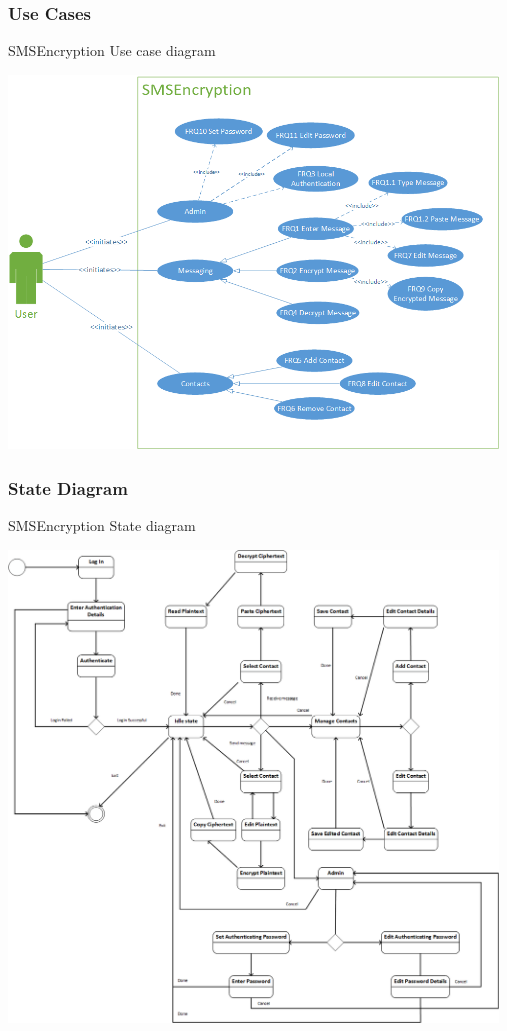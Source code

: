 \newpage
\subsubsection{Use Cases}
SMSEncryption Use case diagram

\begin{center}
 \includegraphics[width=13cm]{diagrams/UseCaseDiagrams/UsecaseV2.png}
\end{center}

\newpage
\subsubsection{State Diagram}
SMSEncryption State diagram

\begin{center}
 \includegraphics[width=13cm]{diagrams/StateDiagrams/SMSEncryptionStateMachine.png}
\end{center}


